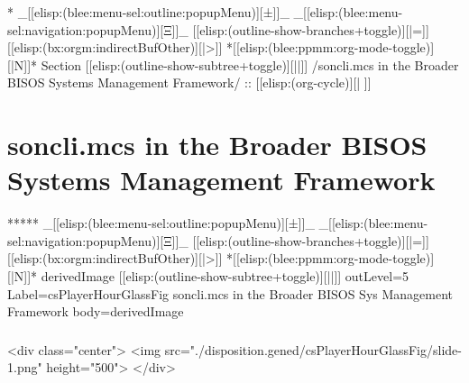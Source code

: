 \begin{whenOrg}
*  _[[elisp:(blee:menu-sel:outline:popupMenu)][±]]_ _[[elisp:(blee:menu-sel:navigation:popupMenu)][Ξ]]_ [[elisp:(outline-show-branches+toggle)][|=]] [[elisp:(bx:orgm:indirectBufOther)][|>]] *[[elisp:(blee:ppmm:org-mode-toggle)][|N]]*  Section    [[elisp:(outline-show-subtree+toggle)][||]]   /soncli.mcs in the Broader BISOS Systems Management Framework/ ::  [[elisp:(org-cycle)][| ]]
\end{whenOrg}

\section{soncli.mcs in the Broader BISOS Systems Management Framework}


\begin{whenOrg}
*****  _[[elisp:(blee:menu-sel:outline:popupMenu)][±]]_ _[[elisp:(blee:menu-sel:navigation:popupMenu)][Ξ]]_ [[elisp:(outline-show-branches+toggle)][|=]] [[elisp:(bx:orgm:indirectBufOther)][|>]] *[[elisp:(blee:ppmm:org-mode-toggle)][|N]]*  derivedImage [[elisp:(outline-show-subtree+toggle)][||]] outLevel=5 Label=csPlayerHourGlassFig soncli.mcs in the Broader BISOS Sys Management Framework body=derivedImage

\end{whenOrg}

\begin{htmlonly}

\begin{frame}[fragile,plain,label=csPlayerHourGlassFig]
    \frametitle{}
    \framesubtitle{}
    \begin{rawhtml}
<div class="center">
<img src="./disposition.gened/csPlayerHourGlassFig/slide-1.png" height="500">
</div>
    \end{rawhtml}
\end{frame}
\end{htmlonly}

